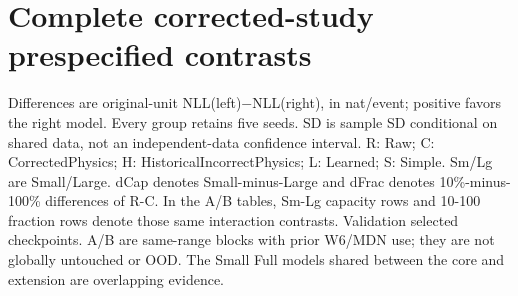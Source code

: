 \section{Complete corrected-study prespecified contrasts}
Differences are original-unit NLL(left)$-$NLL(right), in nat/event; positive favors the right model.
Every group retains five seeds. SD is sample SD conditional on shared data, not an independent-data confidence interval.
R: Raw; C: CorrectedPhysics; H: HistoricalIncorrectPhysics; L: Learned; S: Simple. Sm/Lg are Small/Large.
dCap denotes Small-minus-Large and dFrac denotes 10\%-minus-100\% differences of R-C.
In the A/B tables, Sm-Lg capacity rows and 10-100 fraction rows denote those same interaction contrasts.
Validation selected checkpoints. A/B are same-range blocks with prior W6/MDN use; they are not globally untouched or OOD.
The Small Full models shared between the core and extension are overlapping evidence.
\begingroup\scriptsize
\setlength{\tabcolsep}{3pt}
